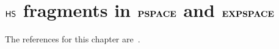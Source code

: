 \chapter{$\text{\sffamily HS}$ fragments in $\textbf{PSPACE}$ and $\textbf{EXPSPACE}$}\label{chap:TCS17}
\begin{chapref}
{\footnotesize The references for this chapter 
are~\cite{BOZZELLI2018,ijcar16,csl15,MMP15,ictcs16}.}
\end{chapref}

\minitoc\mtcskip



%





